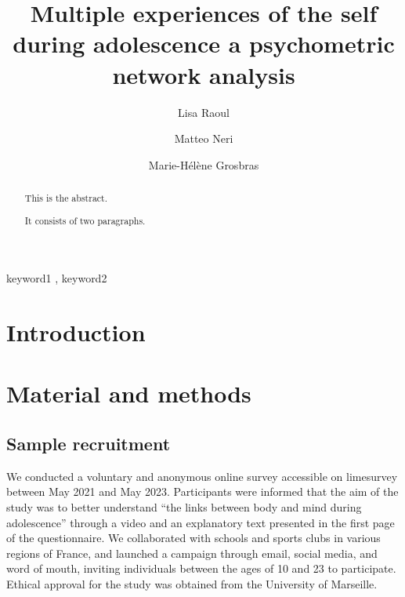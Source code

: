 \documentclass[preprint, 3p,
authoryear]{elsarticle} %
\begin{document}
\begin{frontmatter}

  \title{Multiple experiences of the self during adolescence a
psychometric network analysis}
    \author[LNC]{Lisa Raoul%
  }
    \author[INT]{Matteo Neri%
  }
    \author[LNC]{Marie-Hélène Grosbras%
  }
  
  \begin{abstract}
  This is the abstract.

  It consists of two paragraphs.
  \end{abstract}
    \begin{keyword}
    keyword1 \sep 
    keyword2
  \end{keyword}
  
 \end{frontmatter}

\hypertarget{introduction}{%
\section{Introduction}\label{introduction}}

\newpage

\hypertarget{material-and-methods}{%
\section{Material and methods}\label{material-and-methods}}

\hypertarget{sample-recruitment}{%
\subsection{Sample recruitment}\label{sample-recruitment}}

We conducted a voluntary and anonymous online survey accessible on
limesurvey between May 2021 and May 2023. Participants were informed
that the aim of the study was to better understand ``the links between
body and mind during adolescence'' through a video and an explanatory
text presented in the first page of the questionnaire. We collaborated
with schools and sports clubs in various regions of France, and launched
a campaign through email, social media, and word of mouth, inviting
individuals between the ages of 10 and 23 to participate. Ethical
approval for the study was obtained from the University of Marseille.
\end{document}
